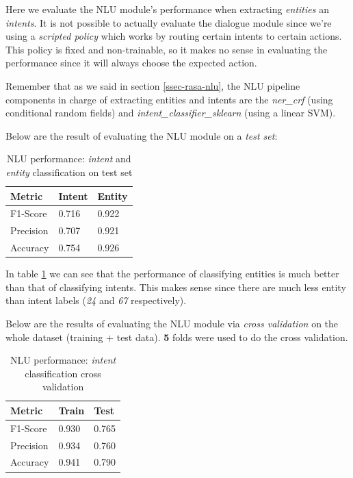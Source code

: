 \documentclass[11pt,a4paper]{article}
\newcommand{\mnintentlabels}{67}
\newcommand{\mnentitylabels}{24}
\begin{document}
	Here we evaluate the NLU module's performance when extracting \textit{entities} an \textit{intents}. It is not possible to actually evaluate the dialogue module since we're using a \textit{scripted policy} which works by routing certain intents to certain actions. This policy is fixed and non-trainable, so it makes no sense in evaluating the performance since it will always choose the expected action. 
	
	Remember that as we said in section \ref{ssec-rasa-nlu}, the NLU pipeline components in charge of extracting entities and intents are the \textit{ner\_crf} (using conditional random fields) and \textit{intent\_classifier\_sklearn} (using a linear SVM).
	
	Below are the result of evaluating the NLU module on a \textit{test set}:
	
	\begin{table}[h!]
		\centering
		\begin{tabular}{l|l|l}
			\textbf{Metric} & \textbf{Intent} & \textbf{Entity} \\ 
			\hline 
			F1-Score & 0.716 & 0.922 \\ 
			\hline 
			Precision & 0.707 & 0.921 \\ 
			\hline 
			Accuracy & 0.754 & 0.926\\ 
			\hline 
		\end{tabular} 
		\caption{NLU performance: \textit{intent} and \textit{entity} classification on test set}
		\label{table:1}
	\end{table}
		
	In table \ref{table:1} we can see that the performance of classifying entities is much better than that of classifying intents. This makes sense since there are much less entity than intent labels (\textit{\mnentitylabels} and \textit{\mnintentlabels} respectively).
	
	Below are the results of evaluating the NLU module via \textit{cross validation} on the whole dataset (training + test data). \textbf{5} folds were used to do the cross validation.
	
	\begin{table}[h!]
		\centering
		\begin{tabular}{l|l|l}
			\textbf{Metric} & \textbf{Train} & \textbf{Test} \\ 
			\hline 
			F1-Score & 0.930 & 0.765 \\ 
			\hline 
			Precision & 0.934 & 0.760\\ 
			\hline 
			Accuracy & 0.941 & 0.790 \\ 
			\hline 
		\end{tabular} 
		\caption{NLU performance: \textit{intent} classification cross validation}
		\label{table:2}
	\end{table}	
	
\end{document}
